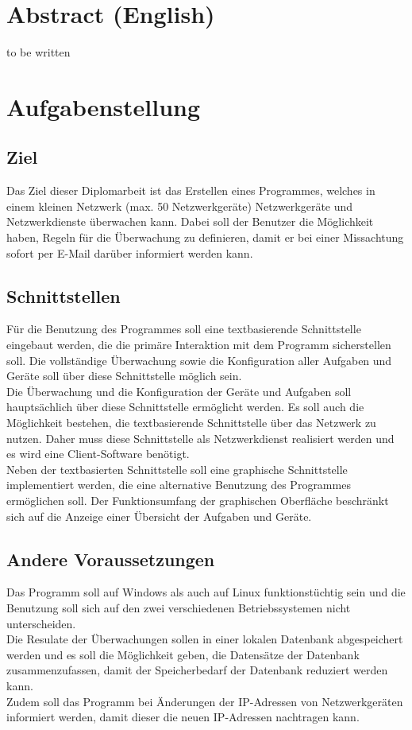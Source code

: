 \documentclass[12pt,a4paper]{report}
\begin{document}
\begin{onehalfspace}
\chapter{Abstract (English)}
to be written

\chapter{Aufgabenstellung}

\section{Ziel}

Das Ziel dieser Diplomarbeit ist das Erstellen eines Programmes, welches in einem kleinen Netzwerk (max. 50 Netzwerkgeräte) Netzwerkgeräte und Netzwerkdienste überwachen kann. Dabei soll der Benutzer die Möglichkeit haben, Regeln für die Überwachung zu definieren, damit er bei einer Missachtung sofort per E-Mail darüber informiert werden kann.

\section{Schnittstellen}

Für die Benutzung des Programmes soll eine textbasierende Schnittstelle eingebaut werden, die die primäre Interaktion mit dem Programm sicherstellen soll. Die vollständige Überwachung sowie die Konfiguration aller Aufgaben und Geräte soll über diese Schnittstelle möglich sein.\\
Die Überwachung und die Konfiguration der Geräte und Aufgaben soll hauptsächlich über diese Schnittstelle ermöglicht werden.
Es soll auch die Möglichkeit bestehen, die textbasierende Schnittstelle über das Netzwerk zu nutzen. Daher muss diese Schnittstelle als Netzwerkdienst realisiert werden und es wird eine Client-Software benötigt.\\
Neben der textbasierten Schnittstelle soll eine graphische Schnittstelle implementiert werden, die eine alternative Benutzung des Programmes ermöglichen soll. Der Funktionsumfang der graphischen Oberfläche beschränkt sich auf die Anzeige einer Übersicht der Aufgaben und Geräte.

\section{Andere Voraussetzungen}

Das Programm soll auf Windows als auch auf Linux funktionstüchtig sein und die Benutzung soll sich auf den zwei verschiedenen Betriebssystemen nicht unterscheiden.\\
Die Resulate der Überwachungen sollen in einer lokalen Datenbank abgespeichert werden und es soll die Möglichkeit geben, die Datensätze der Datenbank zusammenzufassen, damit der Speicherbedarf der Datenbank reduziert werden kann.\\
Zudem soll das Programm bei Änderungen der IP-Adressen von Netzwerkgeräten informiert werden, damit dieser die neuen IP-Adressen nachtragen kann.


\end{onehalfspace}
\end{document}

